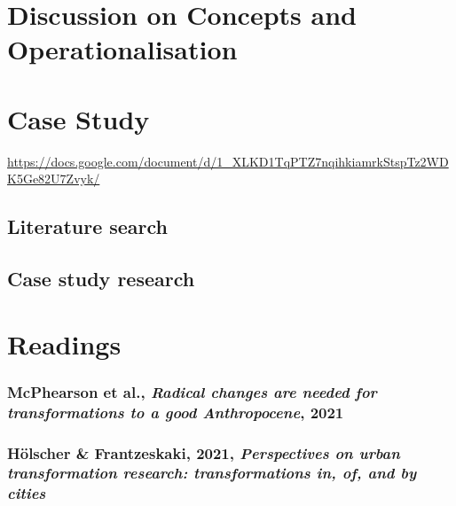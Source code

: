 \documentclass{article}
\begin{document}
\section{Discussion on Concepts and Operationalisation}

\begin{outline}
	\1 
\end{outline}



\section{Case Study}

\url{https://docs.google.com/document/d/1_XLKD1TqPTZ7nqihkiamrkStspTz2WDK5Ge82U7Zvyk/}

\subsection{Literature search}

\subsubsection{ \textit{}}
\begin{outline}
	\1
\end{outline}

\subsection{Case study research}

\pagebreak

\section{Readings}

\subsubsection{McPhearson et al., \textit{Radical changes are needed for transformations to a good Anthropocene}, 2021}

\subsubsection{Hölscher \& Frantzeskaki, 2021, \textit{Perspectives on urban transformation research: transformations in, of, and by cities}}
\end{document}
